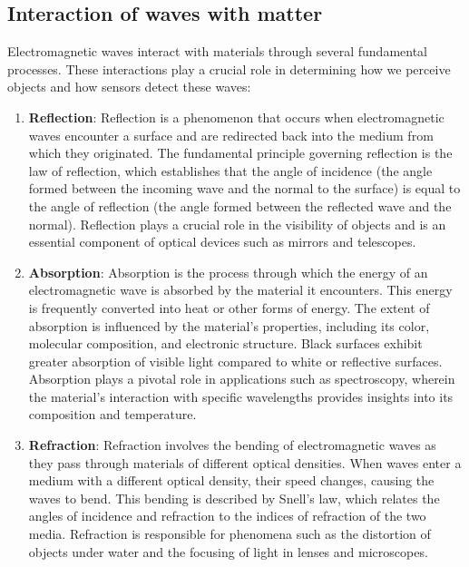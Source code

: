 \documentclass[
  12 pt,
]{Nemilov}
\begin{document}
\subsection{Interaction of waves with matter}\label{interaction-of-waves-with-matter}

Electromagnetic waves interact with materials through several fundamental processes. These interactions play a crucial role in determining how we perceive objects and how sensors detect these waves:

\begin{enumerate}
\def\labelenumi{\arabic{enumi}.}
\item
  \textbf{Reflection}: Reflection is a phenomenon that occurs when electromagnetic waves encounter a surface and are redirected back into the medium from which they originated. The fundamental principle governing reflection is the law of reflection, which establishes that the angle of incidence (the angle formed between the incoming wave and the normal to the surface) is equal to the angle of reflection (the angle formed between the reflected wave and the normal). Reflection plays a crucial role in the visibility of objects and is an essential component of optical devices such as mirrors and telescopes.
\item
  \textbf{Absorption}: Absorption is the process through which the energy of an electromagnetic wave is absorbed by the material it encounters. This energy is frequently converted into heat or other forms of energy. The extent of absorption is influenced by the material's properties, including its color, molecular composition, and electronic structure. Black surfaces exhibit greater absorption of visible light compared to white or reflective surfaces. Absorption plays a pivotal role in applications such as spectroscopy, wherein the material's interaction with specific wavelengths provides insights into its composition and temperature.
\item
  \textbf{Refraction}: Refraction involves the bending of electromagnetic waves as they pass through materials of different optical densities. When waves enter a medium with a different optical density, their speed changes, causing the waves to bend. This bending is described by Snell's law, which relates the angles of incidence and refraction to the indices of refraction of the two media. Refraction is responsible for phenomena such as the distortion of objects under water and the focusing of light in lenses and microscopes.

\end{enumerate}
\end{document}
